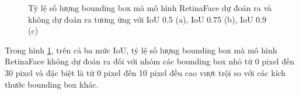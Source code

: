 {    \begin{figure}[H]
        \centering
        \caption{Tỷ lệ số lượng bounding box mà mô hình RetinaFace dự đoán ra và không dự đoán ra tương ứng với IoU 0.5 (a), IoU 0.75 (b), IoU 0.9 (c)}
        \label{fig:retinafocus_iou_compare_percent}
    \end{figure}

    \noindent
    Trong hình \ref{fig:retinafocus_iou_compare_percent}, trên cả ba mức IoU, tỷ lệ số lượng bounding box mà mô hình RetinaFace không dự đoán ra đối với nhóm các bounding box nhỏ từ 0 pixel đến 30 pixel và đặc biệt là từ 0 pixel đến 10 pixel đều cao vượt trội so với các kích thước bounding box khác.

}
